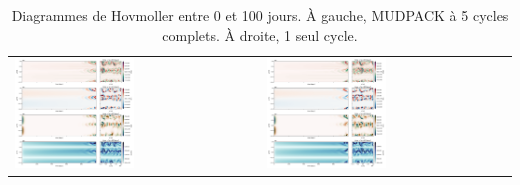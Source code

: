 \documentclass[10pt]{article}
\numberwithin{equation}{section}
\begin{document}
\begin{table}[htbp]
\caption{\label{tab:org6d33fd5}Diagrammes de Hovmoller entre 0 et 100 jours. À gauche, MUDPACK à 5 cycles complets. À droite, 1 seul cycle.}
\centering
\begin{tabular}{ll}
\includegraphics[width=0.5\textwidth]{figures/tests/2023-06-19_hovmoller1_t=1000days_mud.png} & \includegraphics[width=0.5\textwidth]{figures/tests/2023-06-19_hovmoller1_t=1000days_mud_maxcy1.png}\\
\end{tabular}
\end{table}
\end{document}
